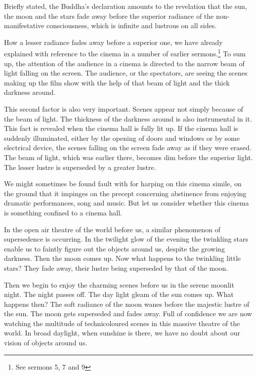 Briefly stated, the Buddha's declaration amounts to the revelation that the sun, the moon and the stars fade away before the superior radiance of the non-manifestative consciousness, which is infinite and lustrous on all sides.

How a lesser radiance fades away before a superior one, we have already explained with reference to the cinema in a number of earlier sermons.\footnote{See sermons 5, 7 and 9} To sum up, the attention of the audience in a cinema is directed to the narrow beam of light falling on the screen. The audience, or the spectators, are seeing the scenes making up the film show with the help of that beam of light and the thick darkness around.

This second factor is also very important. Scenes appear not simply because of the beam of light. The thickness of the darkness around is also instrumental in it. This fact is revealed when the cinema hall is fully lit up. If the cinema hall is suddenly illuminated, either by the opening of doors and windows or by some electrical device, the scenes falling on the screen fade away as if they were erased. The beam of light, which was earlier there, becomes dim before the superior light. The lesser lustre is superseded by a greater lustre.

We might sometimes be found fault with for harping on this cinema simile, on the ground that it impinges on the precept concerning abstinence from enjoying dramatic performances, song and music. But let us consider whether this cinema is something confined to a cinema hall.

In the open air theatre of the world before us, a similar phenomenon of supersedence is occurring. In the twilight glow of the evening the twinkling stars enable us to faintly figure out the objects around us, despite the growing darkness. Then the moon comes up. Now what happens to the twinkling little stars? They fade away, their lustre being superseded by that of the moon.

Then we begin to enjoy the charming scenes before us in the serene moonlit night. The night passes off. The day light gleam of the sun comes up. What happens then? The soft radiance of the moon wanes before the majestic lustre of the sun. The moon gets superseded and fades away. Full of confidence we are now watching the multitude of technicoloured scenes in this massive theatre of the world. In broad daylight, when sunshine is there, we have no doubt about our vision of objects around us.

